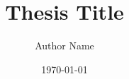\documentclass[12pt,a4paper]{report}
\title{Thesis Title}
\author{Author Name}
\date{\today}
\begin{document}
\maketitle




\tableofcontents
\listoffigures
\listoftables








\begin{appendices}

\end{appendices}

\printbibliography
\end{document}
